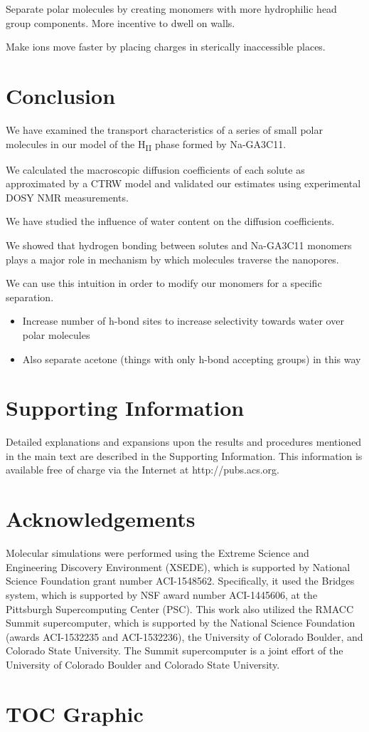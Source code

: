 \documentclass{article}
\begin{document}
  Separate polar molecules by creating monomers with more hydrophilic head group components.
  More incentive to dwell on walls.

  Make ions move faster by placing charges in sterically inaccessible places. 

  \section{Conclusion}

  We have examined the transport characteristics of a series of small polar
  molecules in our model of the H\textsubscript{II} phase formed by 
  Na-GA3C11.

  We calculated the macroscopic diffusion coefficients of each solute as 
  approximated by a CTRW model and validated our estimates using experimental
  DOSY NMR measurements.

  We have studied the influence of water content on the diffusion coefficients.

  We showed that hydrogen bonding between solutes and Na-GA3C11 monomers plays
  a major role in mechanism by which molecules traverse the nanopores. 

  We can use this intuition in order to modify our monomers for a specific 
  separation.
  \begin{itemize}
	\item Increase number of h-bond sites to increase selectivity towards water 
	over polar molecules
	\item Also separate acetone (things with only h-bond accepting groups) in this way
  \end{itemize}
  
 
  \section*{Supporting Information}

  Detailed explanations and expansions upon the results and procedures mentioned in
  the main text are described in the Supporting Information. This information is
  available free of charge via the Internet at http://pubs.acs.org.

  \section*{Acknowledgements}

  Molecular simulations were performed using the Extreme Science and
  Engineering Discovery Environment (XSEDE), which is supported by National
  Science Foundation grant number ACI-1548562. Specifically, it used the Bridges
  system, which is supported by NSF award number ACI-1445606, at the Pittsburgh
  Supercomputing Center (PSC). This work also utilized the RMACC Summit supercomputer,
  which is supported by the National Science Foundation (awards ACI-1532235 and
  ACI-1532236), the University of Colorado Boulder, and Colorado State
  University. The Summit supercomputer is a joint effort of the University of
  Colorado Boulder and Colorado State University.

  \clearpage

  
  

  \newpage

  \section*{TOC Graphic}
\end{document}
